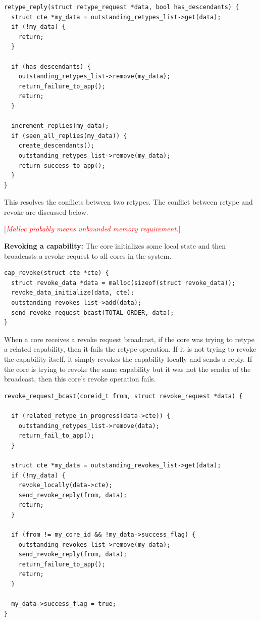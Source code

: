 \documentclass[a4paper,twoside]{report} %
\newcommand{\note}[1]{[\textcolor{red}{\textit{#1}}]}
\begin{document}
\begin{verbatim}
retype_reply(struct retype_request *data, bool has_descendants) {
  struct cte *my_data = outstanding_retypes_list->get(data);
  if (!my_data) {
    return;
  }

  if (has_descendants) {
    outstanding_retypes_list->remove(my_data);
    return_failure_to_app();
    return;
  }

  increment_replies(my_data);
  if (seen_all_replies(my_data)) {
    create_descendants();
    outstanding_retypes_list->remove(my_data);
    return_success_to_app();
  }
}
\end{verbatim}

This resolves the conflicts between two retypes. The conflict between
retype and revoke are discussed below.

\note{Malloc probably means unbounded memory requirement.}

\textbf{Revoking a capability:} The core initializes some local state
and then broadcasts a revoke request to all cores in the system.

\begin{verbatim}
cap_revoke(struct cte *cte) {
  struct revoke_data *data = malloc(sizeof(struct revoke_data));
  revoke_data_initialize(data, cte);
  outstanding_revokes_list->add(data);
  send_revoke_request_bcast(TOTAL_ORDER, data);
}
\end{verbatim}

When a core receives a revoke request broadcast, if the core was
trying to retype a related capability, then it fails the retype
operation. If it is not trying to revoke the capability itself, it
simply revokes the capability locally and sends a reply. If the core
is trying to revoke the same capability but it was not the sender of
the broadcast, then this core's revoke operation fails.

\begin{verbatim}
revoke_request_bcast(coreid_t from, struct revoke_request *data) {

  if (related_retype_in_progress(data->cte)) {
    outstanding_retypes_list->remove(data);
    return_fail_to_app();
  }

  struct cte *my_data = outstanding_revokes_list->get(data);
  if (!my_data) {
    revoke_locally(data->cte);
    send_revoke_reply(from, data);
    return;
  }

  if (from != my_core_id && !my_data->success_flag) {
    outstanding_revokes_list->remove(my_data);
    send_revoke_reply(from, data);
    return_failure_to_app();
    return;
  }

  my_data->success_flag = true;
}
\end{verbatim}
\end{document}
